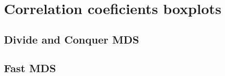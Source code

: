\documentclass[11pt]{report}
\begin{document}
\appendix 

\chapter{Correlation coeficients boxplots}

\section{Divide and Conquer MDS}
\label{div_conquer_corr}

%
%
%
%


\section{Fast MDS}
\label{fast_corr}
\end{document}
